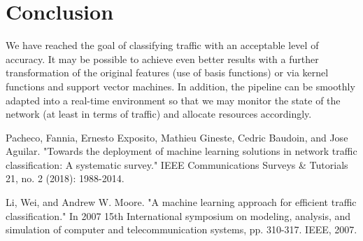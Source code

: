 \documentclass[11pt, USenglish]{article}
\begin{document}
\section{Conclusion}

We have reached the goal of classifying traffic with an acceptable level of accuracy. It may be possible to achieve even better results with a further transformation of the original features (use of basis functions) or via kernel functions and support vector machines. In addition, the pipeline can be smoothly adapted into a real-time environment so that we may monitor the state of the network (at least in terms of traffic) and allocate resources accordingly.
\newpage
	\begin{thebibliography}{99} 
	Pacheco, Fannia, Ernesto Exposito, Mathieu Gineste, Cedric Baudoin, and Jose Aguilar. "Towards the deployment of machine learning solutions in network traffic classification: A systematic survey." IEEE Communications Surveys \& Tutorials 21, no. 2 (2018): 1988-2014.
	
	Li, Wei, and Andrew W. Moore. "A machine learning approach for efficient traffic classification." In 2007 15th International symposium on modeling, analysis, and simulation of computer and telecommunication systems, pp. 310-317. IEEE, 2007.
  
\end{thebibliography}
\end{document}
